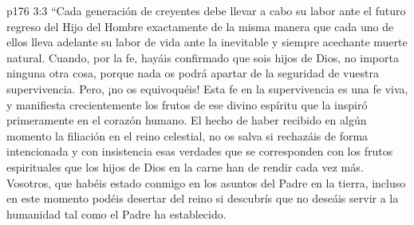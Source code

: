 \vs p176 3:3 “Cada generación de creyentes debe llevar a cabo su labor ante el futuro regreso del Hijo del Hombre exactamente de la misma manera que cada uno de ellos lleva adelante su labor de vida ante la inevitable y siempre acechante muerte natural. Cuando, por la fe, hayáis confirmado que sois hijos de Dios, no importa ninguna otra cosa, porque nada os podrá apartar de la seguridad de vuestra supervivencia. Pero, ¡no os equivoquéis! Esta fe en la supervivencia es una fe viva, y manifiesta crecientemente los frutos de ese divino espíritu que la inspiró primeramente en el corazón humano. El hecho de haber recibido en algún momento la filiación en el reino celestial, no os salva si rechazáis de forma intencionada y con insistencia esas verdades que se corresponden con los frutos espirituales que los hijos de Dios en la carne han de rendir cada vez más. Vosotros, que habéis estado conmigo en los asuntos del Padre en la tierra, incluso en este momento podéis desertar del reino si descubrís que no deseáis servir a la humanidad tal como el Padre ha establecido.
